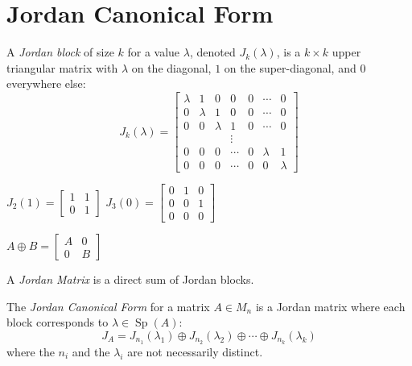 \documentclass[letterpaper,12pt,fleqn]{article}
\DeclareMathOperator{\Sp}{Sp}
\renewcommand{\l}{\lambda}
\begin{document}
\section*{Jordan Canonical Form}

\begin{definition}
  A \emph{Jordan block} of size $k$ for a value $\l$, denoted $J_k(\l)$, is a $k\times k$
  upper triangular matrix with $\l$ on the diagonal, $1$ on the super-diagonal, and $0$
  everywhere else:
  \[J_k(\l)=\begin{bmatrix}
  \l & 1 & 0 & 0 & 0 & \cdots & 0 \\
  0 & \l & 1 & 0 & 0 & \cdots & 0 \\
  0 & 0 & \l & 1 & 0 & \cdots & 0 \\
  & & & \vdots & & & \\
  0 & 0 & 0 & \cdots & 0 & \l & 1 \\
  0 & 0 & 0 & \cdots & 0 & 0 & \l
  \end{bmatrix}\]
\end{definition}

\begin{example}
  $J_2(1)=\begin{bmatrix} 1 & 1 \\ 0 & 1 \end{bmatrix}$
  \hspace{4ex}
  $J_3(0)=\begin{bmatrix}
  0 & 1 & 0 \\
  0 & 0 & 1 \\
  0 & 0 & 0
  \end{bmatrix}$
\end{example}

\begin{notation}
  $A\oplus B=\begin{bmatrix} A & 0 \\ 0 & B \end{bmatrix}$
\end{notation}

\begin{definition}
  A \emph{Jordan Matrix} is a direct sum of Jordan blocks.

  The \emph{Jordan Canonical Form} for a matrix $A\in M_n$ is a Jordan matrix where
  each block corresponds to $\l\in\Sp(A)$:
  \[J_A=J_{n_1}({\l_1})\oplus J_{n_2}({\l_2})\oplus\cdots\oplus J_{n_k}({\l_k})\]
  where the $n_i$ and the $\l_i$ are not necessarily distinct.
\end{definition}
\end{document}
